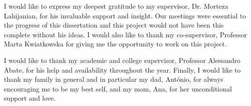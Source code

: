 \begin{acknowledgements}
I would like to express my deepest gratitude to my supervisor, Dr. Morteza Lahijanian, for his invaluable support and insight. Our meetings were essential to the progress of this dissertation and this project would not have been this complete without his ideas. I would also like to thank my co-supervisor, Professor Marta Kwiatkowska for giving me the opportunity to work on this project. 

I would like to thank my academic and college supervisor, Professor Alessandro Abate, for his help and availability throughout the year. Finally, I would like to thank my family in general and in particular my dad, António, for always encouraging me to be my best self, and my mom, Ana, for her unconditional support and love.
\end{acknowledgements}
